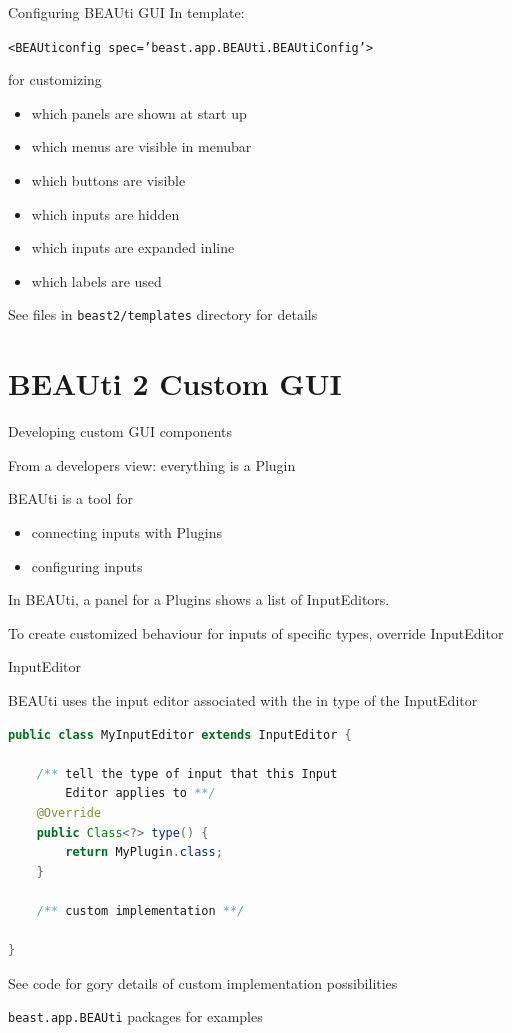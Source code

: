 \documentclass{beamer}
\theoremstyle{definition}
\begin{document}
\begin{frame}[containsverbatim]{Configuring BEAUti GUI}
In template:

{\tt <BEAUticonfig spec='beast.app.BEAUti.BEAUtiConfig'>} 

for customizing 
\begin{itemize}
\item which panels are shown at start up
\item which menus are visible in menubar
\item which buttons are visible
\item which inputs are hidden
\item which inputs are expanded inline
\item which labels are used
\end{itemize}

See files in {\tt beast2/templates} directory for details
\end{frame}

\section{BEAUti 2 Custom GUI}

\begin{frame}[containsverbatim]{Developing custom GUI components}

From a developers view: everything is a Plugin\vskip0.5cm

BEAUti is a tool for \\
\begin{itemize}
\item connecting inputs with Plugins\\
\item configuring inputs\vskip0.5cm
\end{itemize}

In BEAUti, a panel for a Plugins shows a list of InputEditors.\vskip0.5cm

To create customized behaviour for inputs of specific types, 
override InputEditor
\end{frame}

\begin{frame}[containsverbatim]{InputEditor}


BEAUti uses the input editor associated with the in type of the InputEditor\vskip0.5cm


\begin{lstlisting}[language=java]
public class MyInputEditor extends InputEditor {

    /** tell the type of input that this Input 
        Editor applies to **/
	@Override
    public Class<?> type() {
        return MyPlugin.class;
    }

    /** custom implementation **/

} 
\end{lstlisting}

See code for gory details of custom implementation possibilities\vskip0.5cm

{\tt beast.app.BEAUti} packages for examples

\end{frame}
\end{document}
